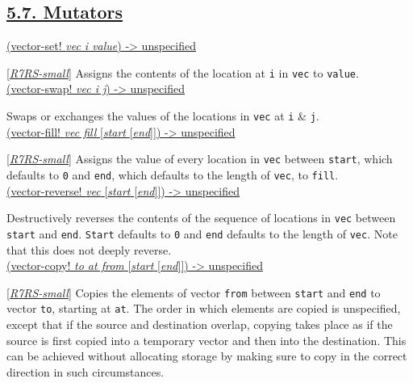 \subsection{\texorpdfstring{\href{}{5.7.
Mutators}}{5.7. Mutators}}\label{mutators}

\href{}{(vector-set! \emph{vec i value}) -\textgreater{} unspecified}

{[}\protect\hyperlink{R7RS-small}{\emph{R7RS-small}}{]} Assigns the
contents of the location at \texttt{i} in \texttt{vec} to
\texttt{value}.\\[2\baselineskip]

\href{}{(vector-swap! \emph{vec i j}) -\textgreater{} unspecified}

Swaps or exchanges the values of the locations in \texttt{vec} at
\texttt{i} \& \texttt{j}.\\[2\baselineskip]

\href{}{(vector-fill! \emph{vec fill} {[}\emph{start}
{[}\emph{end}{]}{]}) -\textgreater{} unspecified}

{[}\protect\hyperlink{R7RS-small}{\emph{R7RS-small}}{]} Assigns the
value of every location in \texttt{vec} between \texttt{start}, which
defaults to \texttt{0} and \texttt{end}, which defaults to the length of
\texttt{vec}, to \texttt{fill}.\\[2\baselineskip]

\href{}{(vector-reverse! \emph{vec} {[}\emph{start} {[}\emph{end}{]}{]})
-\textgreater{} unspecified}

Destructively reverses the contents of the sequence of locations in
\texttt{vec} between \texttt{start} and \texttt{end}. \texttt{Start}
defaults to \texttt{0} and \texttt{end} defaults to the length of
\texttt{vec}. Note that this does not deeply reverse.\\[2\baselineskip]

\href{}{(vector-copy! \emph{to at from} {[}\emph{start}
{[}\emph{end}{]}{]}) -\textgreater{} unspecified}

{[}\protect\hyperlink{R7RS-small}{\emph{R7RS-small}}{]} Copies the
elements of vector \texttt{from} between \texttt{start} and \texttt{end}
to vector \texttt{to}, starting at \texttt{at}. The order in which
elements are copied is unspecified, except that if the source and
destination overlap, copying takes place as if the source is first
copied into a temporary vector and then into the destination. This can
be achieved without allocating storage by making sure to copy in the
correct direction in such circumstances.\\[2\baselineskip]

